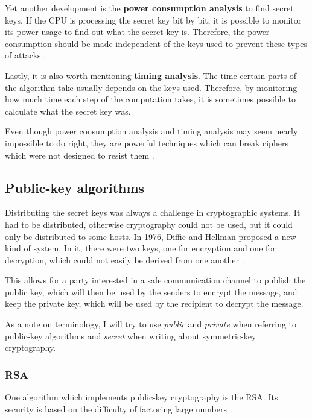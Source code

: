 Yet another development is the \textbf{power consumption analysis} to find secret keys.
If the CPU is processing the secret key bit by bit, it is possible to monitor its power usage to find out what the secret key is.
Therefore, the power consumption should be made independent of the keys used to prevent these types of attacks \cite[p.~793]{computer-networks-tanenbaum-2012}.

Lastly, it is also worth mentioning \textbf{timing analysis}. The time certain parts of the algorithm take usually depends on the keys used.
Therefore, by monitoring how much time each step of the computation takes, it is sometimes possible to calculate what the secret key was.

Even though power consumption analysis and timing analysis may seem nearly impossible to do right, they are powerful techniques which can break ciphers which were not designed to resist them \cite[p.~793]{computer-networks-tanenbaum-2012}.

\subsection{Public-key algorithms}

Distributing the secret keys was always a challenge in cryptographic systems. It had to be distributed, otherwise cryptography could not be used, but it could only be distributed to some hosts.
In 1976, Diffie and Hellman proposed a new kind of system. In it, there were two keys, one for encryption and one for decryption, which could not easily be derived from one another \cite[p.~794]{computer-networks-tanenbaum-2012}.

This allows for a party interested in a safe communication channel to publish the public key, which will then be used by the senders to encrypt the message, and keep the private key, which will be used by the recipient to decrypt the message.

As a note on terminology, I will try to use \textit{public} and \textit{private} when referring to public-key algorithms and \textit{secret} when writing about symmetric-key cryptography.

\subsubsection{RSA}

One algorithm which implements public-key cryptography is the RSA.
Its security is based on the difficulty of factoring large numbers \cite[p.~795]{computer-networks-tanenbaum-2012}.

